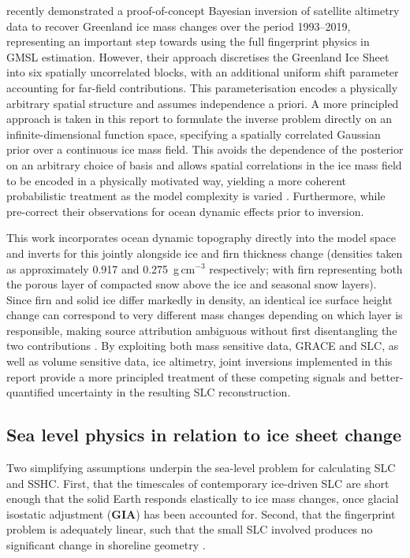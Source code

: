 \Textcite{coulsonInvertingSeaSurface2026} recently demonstrated a proof-of-concept Bayesian inversion of satellite altimetry data to recover Greenland ice mass changes over the period 1993--2019, representing an important step towards using the full fingerprint physics in GMSL estimation. However, their approach discretises the Greenland Ice Sheet into six spatially uncorrelated blocks, with an additional uniform shift parameter accounting for far-field contributions. This parameterisation encodes a physically arbitrary spatial structure and assumes independence a priori. A more principled approach is taken in this report to formulate the inverse problem directly on an infinite-dimensional function space, specifying a spatially correlated Gaussian prior over a continuous ice mass field. This avoids the dependence of the posterior on an arbitrary choice of basis and allows spatial correlations in the ice mass field to be encoded in a physically motivated way, yielding a more coherent probabilistic treatment as the model complexity is varied \autocite{stuartInverseProblemsBayesian2010}. Furthermore, while \textcite{coulsonInvertingSeaSurface2026} pre-correct their observations for ocean dynamic effects prior to inversion.

This work incorporates ocean dynamic topography directly into the model space and inverts for this jointly alongside ice and firn thickness change (densities taken as approximately 0.917 and 0.275~g\,cm$^{-3}$ respectively; with firn representing both the porous layer of compacted snow above the ice and seasonal snow layers). Since firn and solid ice differ markedly in density, an identical ice surface height change can correspond to very different mass changes depending on which layer is responsible, making source attribution ambiguous without first disentangling the two contributions \autocite{heathcoteScaleableBayesianFramework2026, coulsonInvertingSeaSurface2026}. By exploiting both mass sensitive data, GRACE and SLC, as well as volume sensitive data, ice altimetry, joint inversions implemented in this report provide a more principled treatment of these competing signals and better-quantified uncertainty in the resulting SLC reconstruction.

\subsection{Sea level physics in relation to ice sheet change}\label{sec:slp}

Two simplifying assumptions underpin the sea-level problem for calculating SLC and SSHC. First, that the timescales of contemporary ice-driven SLC are short enough that the solid Earth responds elastically to ice mass changes, once glacial isostatic adjustment (\textbf{GIA}) has been accounted for. Second, that the fingerprint problem is adequately linear, such that the small SLC involved produces no significant change in shoreline geometry \autocite{al-attarReciprocitySensitivityKernels2023}.

